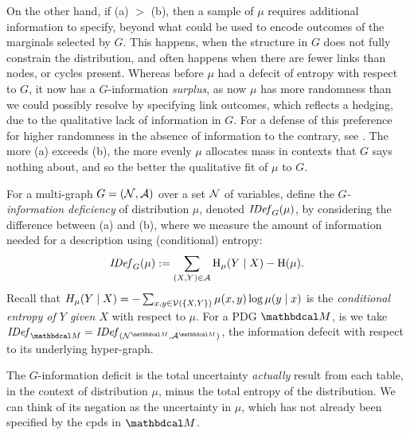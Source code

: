 \documentclass{article}
\begin{document}
On the other hand, if (a) $>$ (b), then a sample of $\mu$ requires additional information to specify, beyond what could be used to encode outcomes of the marginals selected by $G$. This happens, when the structure in $G$ does not fully constrain the distribution, and often happens when there are fewer links than nodes, or cycles present. Whereas before $\mu$ had a defecit of entropy with respect to $G$, it now has a $G$-information \emph{surplus}, as now $\mu$ has more randomness than we could possibly resolve by specifying link outcomes, which reflects a hedging, due to the qualitative lack of information in $G$. For a defense of this preference for higher randomness in the absence of information to the contrary, see \cite{maxent}\cite{adversarial_protection}. The more (a) exceeds (b), the more evenly $\mu$ allocates mass in contexts that $G$ says nothing about, and so the better the qualitative fit of $\mu$ to $G$.
\begin{defn}\label{def:info-deficiency}
	For a multi-graph $G = (\mathcal N, \mathcal A)$ over a set $\mathcal N$ of variables,
	define the \emph{$G$-information deficiency}
	of distribution $\mu$, denoted $\mathit{IDef}_{G}(\mu)$,
	by considering the difference between (a) and (b), 
	where we measure the amount of information needed for a description
	using (conditional) entropy: 
	\begin{equation}
		\mathit{IDef}_{G}(\mu) := \sum_{(X,Y) \in \mathcal A} \operatorname{\mathrm{H}}_\mu(Y\mid X) - \operatorname{\mathrm{H}}(\mu). 
		\label{eqn:idef}
	\end{equation}
	Recall that $H_\mu(Y\mid X) = - \sum_{x,y \in \mathcal V(\{X,Y\})} \mu(x,y) \log \mu(y\mid x)$ is the
	\emph{conditional entropy of $Y$ given $X$} with respect to $\mu$.
	For a PDG ${\dg M}$, is we take $\IDef{\dg M} = \IDef{(\N^{\dg M}, \Ed^{\dg M})}$, the information defecit with respect to its underlying hyper-graph.
\end{defn}

The $G$-information deficit is the total uncertainty \emph{actually} result from each table, in the context of distribution $\mu$, minus the total entropy of the distribution. We can think of its negation as the uncertainty in $\mu$, which has not already been specified by the cpds in $\dg M$. 	
\end{document}
